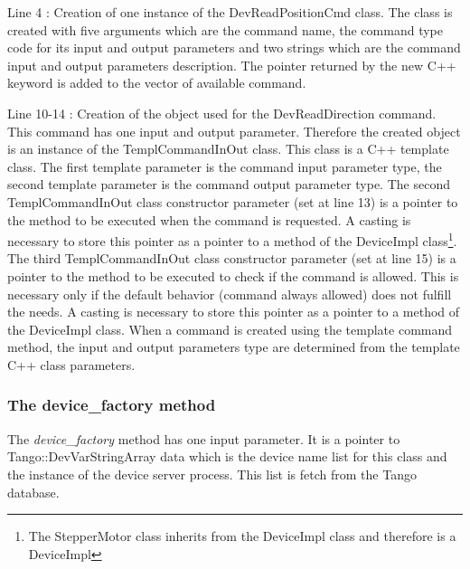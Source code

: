 Line 4 : Creation of one instance of the DevReadPositionCmd class.
The class is created with five arguments which are the command name,
the command type code for its input and output parameters and two
strings which are the command input and output parameters description.
The pointer returned by the new C++ keyword is added to the vector
of available command.

Line 10-14 : Creation of the object used for the DevReadDirection
command. This command has one input and output parameter. Therefore
the created object is an instance of the TemplCommandInOut class.
This class is a C++ template class. The first template parameter is
the command input parameter type, the second template parameter is
the command output parameter type. The second TemplCommandInOut
class constructor parameter (set at line 13) is a pointer to the method
to be executed when the command is requested. A casting is necessary
to store this pointer as a pointer to a method of the DeviceImpl class\footnote{The StepperMotor class inherits from the DeviceImpl class and therefore
is a DeviceImpl}. The third TemplCommandInOut class constructor parameter (set at
line 15) is a pointer to the method to be executed to check if the
command is allowed. This is necessary only if the default behavior
(command always allowed) does not fulfill the needs. A casting is
necessary to store this pointer as a pointer to a method of the DeviceImpl
class. When a command is created using the template command method,
the input and output parameters type are determined from the template
C++ class parameters.

\subsubsection{The device\_factory method}

The \emph{device\_factory} method has one input
parameter. It is a pointer to Tango::DevVarStringArray data which
is the device name list for this class and the instance of the device
server process. This list is fetch from the Tango database.

